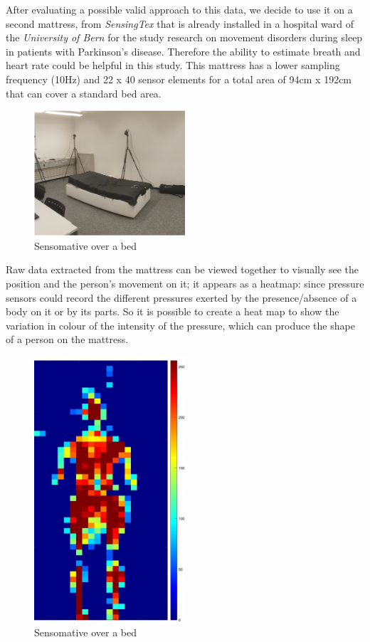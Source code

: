 After evaluating a possible valid approach to this data, we decide to use it on a second mattress, from \textit{SensingTex} \cite{SensingConnectivity} that is already installed in a hospital ward of the \textit{University of Bern} for the study research on movement disorders during sleep in patients with Parkinson’s disease. Therefore the ability to estimate breath and heart rate could be helpful in this study.
This mattress has a lower sampling frequency (10Hz) and 22 x 40 sensor elements for a total area of 94cm x 192cm that can cover a standard bed area.


\begin{figure}[h]
    \centering
    \includegraphics[width=0.5\textwidth]{img/sensingtex.png}
    \caption{Sensomative over a bed}
    \label{fig:sensingtex}
\end{figure}


Raw data extracted from the mattress can be viewed together to visually see the position and the person's movement on it; it appears as a heatmap: since pressure sensors could record the different pressures exerted by the presence/absence of a body on it or by its parts. 
So it is possible to create a heat map to show the variation in colour of the intensity of the pressure, which can produce the shape of a person on the mattress.


\begin{figure}[h]
    \centering
    \includegraphics[width=0.5\textwidth]{img/sensingtex_2.jpg}
    \caption{Sensomative over a bed}
    \label{fig:sensingtexData}
\end{figure}



